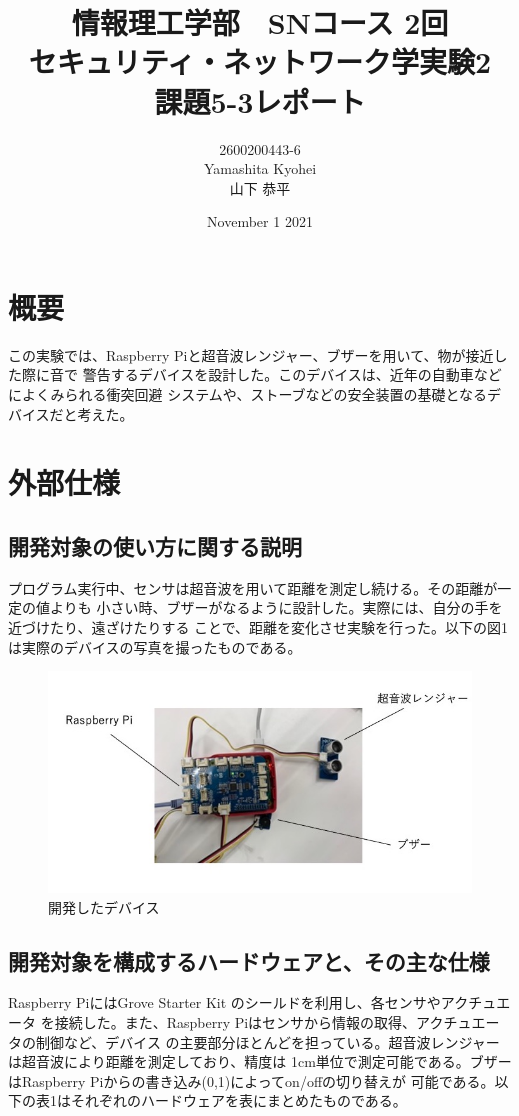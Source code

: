 \documentclass[dvipdfmx,autodetect-engine,titlepage]{jsarticle}
\title{情報理工学部　SNコース 2回\\
セキュリティ・ネットワーク学実験2\\
課題5-3レポート}
\author{2600200443-6\\Yamashita Kyohei\\山下 恭平}
\date{November 1 2021}
\begin{document}
\maketitle

\section{概要}
この実験では、Raspberry Piと超音波レンジャー、ブザーを用いて、物が接近した際に音で
警告するデバイスを設計した。このデバイスは、近年の自動車などによくみられる衝突回避
システムや、ストーブなどの安全装置の基礎となるデバイスだと考えた。

\section{外部仕様}

 \subsection{開発対象の使い方に関する説明}
  プログラム実行中、センサは超音波を用いて距離を測定し続ける。その距離が一定の値よりも
  小さい時、ブザーがなるように設計した。実際には、自分の手を近づけたり、遠ざけたりする
  ことで、距離を変化させ実験を行った。以下の図1は実際のデバイスの写真を撮ったものである。

 \begin{figure}[h]
  \centering
  \includegraphics[scale=0.5]{pic1.jpg}
  \caption{開発したデバイス}
\end{figure}

 
 \subsection{開発対象を構成するハードウェアと、その主な仕様}
 Raspberry PiにはGrove Starter Kit のシールドを利用し、各センサやアクチュエータ
 を接続した。また、Raspberry Piはセンサから情報の取得、アクチュエータの制御など、デバイス
 の主要部分ほとんどを担っている。超音波レンジャーは超音波により距離を測定しており、精度は
 1cm単位で測定可能である。ブザーはRaspberry Piからの書き込み(0,1)によってon/offの切り替えが
 可能である。以下の表1はそれぞれのハードウェアを表にまとめたものである。
\end{document}
